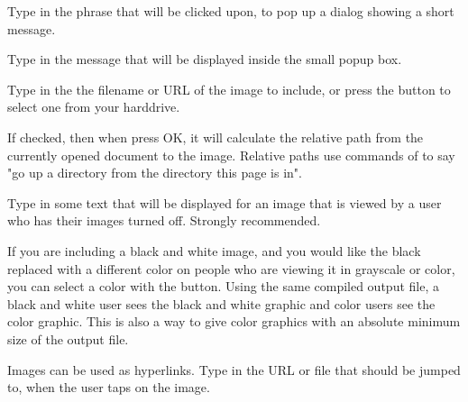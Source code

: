 \notimplemented

 Type in the phrase that will be clicked upon, 
to pop up a dialog showing a short message.  

\item {} Type in the message that will be displayed 
inside the small popup box.



 Type in the the filename or URL of the 
image to include, or press the  button to 
select one from your harddrive.  

 If checked, then
when press OK, it will calculate the relative path from the currently opened
document to the image. Relative paths use commands of  to say "go 
up a directory from the directory this page is in". \notimplemented

 Type in some text that will be 
displayed for an image that is viewed by a \brandingapplicationsuitename user who has their images 
turned off. Strongly recommended.

 If you are including a black and white image, 
and you would like the black replaced with a different color on people who 
are viewing it in grayscale or color, you can select a color with the 
 button. Using the same compiled output file, 
a black and white user sees the black and white graphic and color users see 
the color graphic. This is also a way to give color graphics with an absolute 
minimum size of the output file.

 Images can be used as hyperlinks. Type in 
the URL or file that should be jumped to, when the user taps on the image.  

